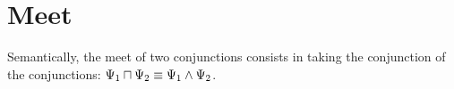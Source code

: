 \section{Meet}

Semantically, the meet of two conjunctions consists in taking the conjunction of the conjunctions:
$\Psi_1 \sqcap \Psi_2 \equiv \Psi_1 \land \Psi_2$.
